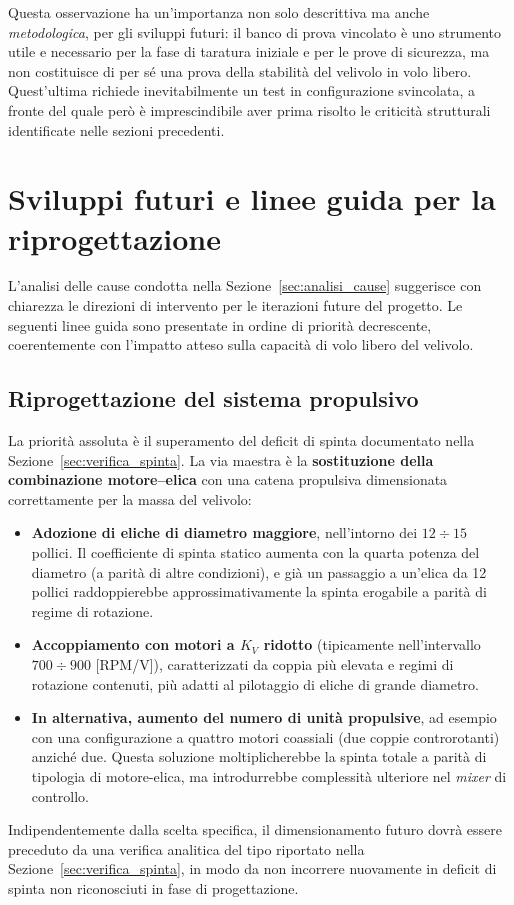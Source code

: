 \documentclass[11pt]{report}
\begin{document}
	Questa osservazione ha un'importanza non solo descrittiva ma anche \textit{metodologica}, per gli sviluppi futuri: il banco di prova vincolato è uno strumento utile e necessario per la fase di taratura iniziale e per le prove di sicurezza, ma non costituisce di per sé una prova della stabilità del velivolo in volo libero. Quest'ultima richiede inevitabilmente un test in configurazione svincolata, a fronte del quale però è imprescindibile aver prima risolto le criticità strutturali identificate nelle sezioni precedenti.
	
	\section{Sviluppi futuri e linee guida per la riprogettazione}
	\label{sec:sviluppi_futuri}
	
	L'analisi delle cause condotta nella Sezione~\ref{sec:analisi_cause} suggerisce con chiarezza le direzioni di intervento per le iterazioni future del progetto. Le seguenti linee guida sono presentate in ordine di priorità decrescente, coerentemente con l'impatto atteso sulla capacità di volo libero del velivolo.
	
	\subsection{Riprogettazione del sistema propulsivo}
	\label{sec:riprogettazione_propulsiva}
	La priorità assoluta è il superamento del deficit di spinta documentato nella Sezione~\ref{sec:verifica_spinta}. La via maestra è la \textbf{sostituzione della combinazione motore--elica} con una catena propulsiva dimensionata correttamente per la massa del velivolo:
	\begin{itemize}
		\item \textbf{Adozione di eliche di diametro maggiore}, nell'intorno dei $12 \div 15$ pollici. Il coefficiente di spinta statico aumenta con la quarta potenza del diametro (a parità di altre condizioni), e già un passaggio a un'elica da 12 pollici raddoppierebbe approssimativamente la spinta erogabile a parità di regime di rotazione.
		\item \textbf{Accoppiamento con motori a $K_V$ ridotto} (tipicamente nell'intervallo $700 \div 900$ [RPM/V]), caratterizzati da coppia più elevata e regimi di rotazione contenuti, più adatti al pilotaggio di eliche di grande diametro.
		\item \textbf{In alternativa, aumento del numero di unità propulsive}, ad esempio con una configurazione a quattro motori coassiali (due coppie controrotanti) anziché due. Questa soluzione moltiplicherebbe la spinta totale a parità di tipologia di motore-elica, ma introdurrebbe complessità ulteriore nel \textit{mixer} di controllo.
	\end{itemize}
	Indipendentemente dalla scelta specifica, il dimensionamento futuro dovrà essere preceduto da una verifica analitica del tipo riportato nella Sezione~\ref{sec:verifica_spinta}, in modo da non incorrere nuovamente in deficit di spinta non riconosciuti in fase di progettazione.
	
\end{document}
